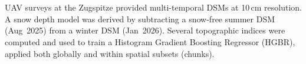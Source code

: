 \section*{}

UAV surveys at the Zugspitze provided multi-temporal DSMs at 10\,cm resolution.
A snow depth model was derived by subtracting a snow-free summer DSM (Aug~2025) from a winter
DSM (Jan~2026). Several topographic indices were computed and used to train a Histogram Gradient
Boosting Regressor (HGBR), applied both globally and within spatial subsets (chunks).

